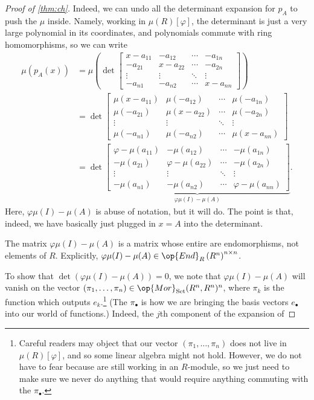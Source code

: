 \begin{proof}[Proof of \autoref{thm:ch}]
	Indeed, we can undo all the determinant expansion for $p_A$ to push the $\mu$ inside. Namely, working in $\mu(R)[\varphi]$, the determinant is just a very large polynomial in its coordinates, and polynomials commute with ring homomorphisms, so we can write
	\begin{align*}
		\mu(p_A(x)) &= \mu\left(\det\begin{bmatrix}
			x-a_{11} & -a_{12} & \cdots & -a_{1n} \\
			-a_{21} & x-a_{22} & \cdots & -a_{2n} \\
			\vdots & \vdots & \ddots & \vdots \\
			-a_{n1} & -a_{n2} & \cdots & x-a_{nn}
		\end{bmatrix}\right) \\
		&=\det\begin{bmatrix}
			\mu(x-a_{11}) & \mu(-a_{12}) & \cdots & \mu(-a_{1n}) \\
			\mu(-a_{21}) & \mu(x-a_{22}) & \cdots & \mu(-a_{2n}) \\
			\vdots & \vdots & \ddots & \vdots \\
			\mu(-a_{n1}) & \mu(-a_{n2}) & \cdots & \mu(x-a_{nn})
		\end{bmatrix} \\
		&=\det\underbrace{\begin{bmatrix}
			\varphi-\mu(a_{11}) & -\mu(a_{12}) & \cdots & -\mu(a_{1n}) \\
			-\mu(a_{21}) & \varphi-\mu(a_{22}) & \cdots & -\mu(a_{2n}) \\
			\vdots & \vdots & \ddots & \vdots \\
			-\mu(a_{n1}) & -\mu(a_{n2}) & \cdots & \varphi-\mu(a_{nn})
		\end{bmatrix}}_{\varphi\mu(I)-\mu(A)}.
	\end{align*}
	Here, $\varphi\mu(I)-\mu(A)$ is abuse of notation, but it will do. The point is that, indeed, we have basically just plugged in $x=A$ into the determinant.
	\begin{warn}
		The matrix $\varphi\mu(I)-\mu(A)$ is a matrix whose entire are endomorphisms, not elements of $R$. Explicitly, $\varphi\mu(I)-\mu(A)\in\op{End}_R\left(R^n\right)^{n\times n}$.
	\end{warn}
	To show that $\det(\varphi\mu(I)-\mu(A))=0$, we note that $\varphi\mu(I)-\mu(A)$ will vanish on the vector $(\pi_1,\ldots,\pi_n)\in\op{Mor}_{\mathrm{Set}}(R^n,R^n)^n$, where $\pi_k$ is the function which outputs $e_k$.\footnote{Careful readers may object that our vector $(\pi_1,\ldots,\pi_n)$ does not live in $\mu(R)[\varphi]$, and so some linear algebra might not hold. However, we do not have to fear because are still working in an $R$-module, so we just need to make sure we never do anything that would require anything commuting with the $\pi_\bullet$.} (The $\pi_\bullet$ is how we are bringing the basis vectors $e_\bullet$ into our world of functions.) Indeed, the $j$th component of the expansion of

\end{proof}
